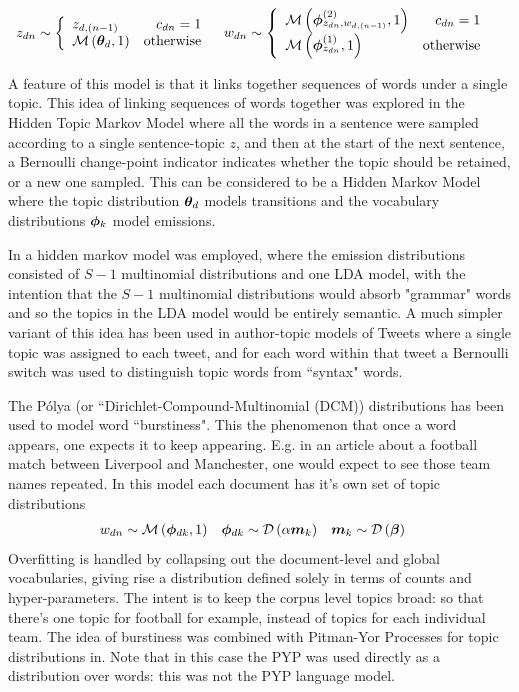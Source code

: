 \begin{align}
z_{dn} & \sim \left\{
    \begin{array}{lr}
        z_{d,(n-1)} & c_{dn} = 1 \\
        \mathcal{M} \left( {{ \bm \theta_d }},{1} \right) & \text{otherwise}
    \end{array}
\right.
& 
w_{dn} & \sim \left\{
    \begin{array}{lr}
        \mathcal{M} \left( {\bm \phi_{z_{dn},w_{d,(n-1)}}^{(2)}},{1} \right) & c_{dn} = 1 \\
        \mathcal{M} \left( {\bm \phi_{z_{dn}}^{(1)}},{1} \right) & \text{otherwise}
    \end{array}
\right.
\end{align}

A feature of this model is that it links together sequences of words under a single topic. This idea of linking sequences of words together was explored in the Hidden Topic Markov Model\cite{Gruber2007} where all the words in a sentence were sampled according to a single sentence-topic $z$, and then at the start of the next sentence, a Bernoulli change-point indicator indicates whether the topic should be retained, or a new one sampled. This can be considered to be a Hidden Markov Model where the topic distribution ${ \bm \theta_d }$ models transitions and the vocabulary distributions $\bm \phi_k$ model emissions. 

In \cite{Griffiths2005} a hidden markov model was employed, where the emission distributions consisted of $S-1$ multinomial distributions and one LDA model, with the intention that the $S-1$ multinomial distributions would absorb "grammar" words and so the topics in the LDA model would be entirely semantic. A much simpler variant of this idea has been used in author-topic models of Tweets\cite{Zhao2011}\cite{Zhao2011a} where a single topic was assigned to each tweet, and for each word within that tweet a Bernoulli switch was used to distinguish topic words from ``syntax" words.

The P\'olya (or ``Dirichlet-Compound-Multinomial (DCM)) distributions has been used to model word ``burstiness"\cite{Madsen2005}. This the phenomenon that once a word appears, one expects it to keep appearing. E.g. in an article about a football match between Liverpool and Manchester, one would expect to see those team names repeated. In this model each document has it's own set of topic distributions
\begin{align}
w_{dn} & \sim \mathcal{M} \left( {\bm \phi_{dk}},{1} \right) &
\bm \phi_{dk} & \sim \mathcal{D} \left( {\alpha \bm m_k} \right) &
\bm m_k & \sim \mathcal{D} \left( {\bm \beta} \right)
\end{align}
Overfitting is handled by collapsing out the document-level and global vocabularies, giving rise a distribution defined solely in terms of counts and hyper-parameters. The intent is to keep the corpus level topics broad: so that there's one topic for football for example, instead of topics for each individual team. The idea of burstiness was combined with Pitman-Yor Processes for topic distributions in\cite{Buntine2014}. Note that in this case the PYP was used directly as a distribution over words: this was not the PYP language model.

